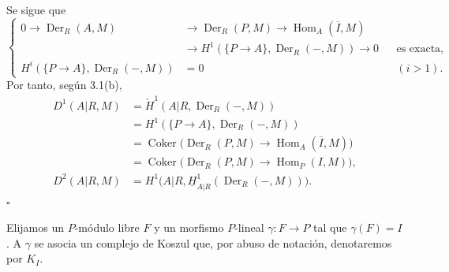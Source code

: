
Se sigue que
\[
\left\{
\begin{aligned}
0\longrightarrow\operatorname{Der}_R(A,M)
&\longrightarrow\operatorname{Der}_R(P,M)
\longrightarrow\operatorname{Hom}_A(\overline I,M)\\
&\longrightarrow
H^1(\{P\longrightarrow A\},\operatorname{Der}_R(-,M))
\longrightarrow0
&&\text{es exacta},\\
H^i(\{P\longrightarrow A\},\operatorname{Der}_R(-,M))
&=0 &&(i>1).
\end{aligned}
\right.
\]
Por tanto, según 3.1(b),
\begin{align*}
D^1(A|R,M)
 &=\check H^1(A|R,\operatorname{Der}_R(-,M))\\
 &=H^1(\{P\longrightarrow A\},\operatorname{Der}_R(-,M))\\
 &=\operatorname{Coker}\bigl(
   \operatorname{Der}_R(P,M)\longrightarrow
   \operatorname{Hom}_A(\overline I,M)\bigr)\\
 &=\operatorname{Coker}\bigl(
   \operatorname{Der}_R(P,M)\longrightarrow
   \operatorname{Hom}_P(I,M)\bigr),\\
D^2(A|R,M)
 &=H^1\bigl(A|R,
   \underline H^1_{A|R}(\operatorname{Der}_R(-,M))\bigr).
\end{align*}
\hfill$\square$

Elijamos un $P$-módulo libre $F$ y un morfismo $P$-lineal
$\gamma:F\longrightarrow P$ tal que $\gamma(F)=I$. A $\gamma$ se
asocia un complejo de Koszul que, por abuso de notación, denotaremos
por $K_I$.
\par
